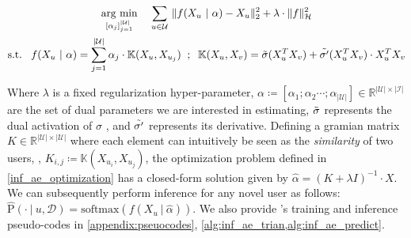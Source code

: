\documentclass{article}
\begin{document}
\begin{align} \label{inf_ae_optimization}
\begin{gathered}
    \underset{[\alpha_j]_{j=1}^{|\mathcal{U}|}}{\operatorname{arg}\,\operatorname{min}}\; \hspace{0.3cm} \sum_{u \in \mathcal{U}} \ \lVert f(X_u ~|~ \alpha) - X_u \rVert_2^2 + \lambda \cdot \lVert f \rVert_{\mathcal{H}}^2 \\
\text{s.t.} \hspace{0.3cm} f(X_u ~|~ \alpha) = \sum_{j=1}^{|\mathcal{U}|} \alpha_j \cdot \mathbb{K}(X_u, X_{u_j})
    \hspace{0.2cm} ; \hspace{0.2cm}
    \mathbb{K}(X_u, X_v) = \Tilde{\sigma}(X_u^T X_v) + \Tilde{\sigma'}(X_u^T X_v) \cdot X_u^T X_v
\end{gathered}
\end{align}

Where $\lambda$ is a fixed regularization hyper-parameter, $\alpha \coloneqq [ \alpha_1 ; \alpha_2 \cdots ; \alpha_{|\mathcal{U}|} ] \in \mathbb{R}^{|\mathcal{U}| \times |\mathcal{I}|}$ are the set of dual parameters we are interested in estimating, $\Tilde{\sigma}$ represents the dual activation of $\sigma$ \cite{dual_activation}, and $\Tilde{\sigma'}$ represents its derivative. Defining a gramian matrix $K \in \mathbb{R}^{|\mathcal{U}|\times|\mathcal{U}|}$ where each element can intuitively be seen as the \emph{similarity} of two users, \ie, $K_{i, j} \coloneqq \mathbb{K}(X_{u_i}, X_{u_j})$, the optimization problem defined in \cref{inf_ae_optimization} has a closed-form solution given by $\hat{\alpha} = (K + \lambda I)^{-1} \cdot X$. We can subsequently perform inference for any novel user as follows: $\hat{\text{P}}(\cdot ~|~ u, \mathcal{D}) = \text{softmax}(f(X_u ~|~ \hat{\alpha}))$. We also provide \model's training and inference pseudo-codes in \cref{appendix:pseuocodes}, \cref{alg:inf_ae_trian,alg:inf_ae_predict}.
\end{document}
